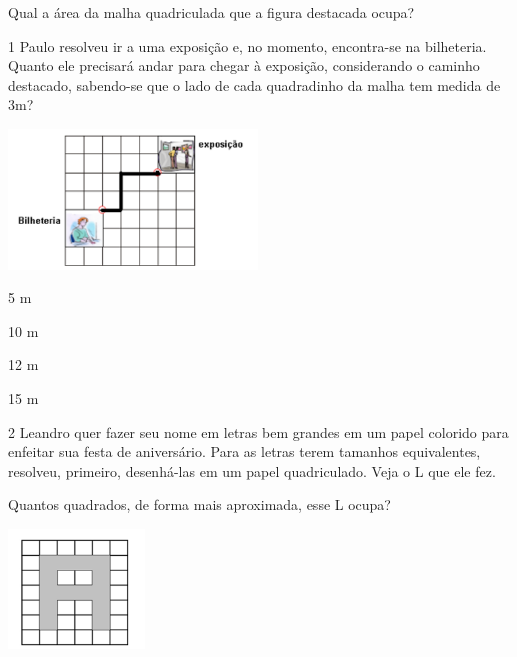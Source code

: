 Qual a área da malha quadriculada que a figura destacada ocupa?




\num{1} Paulo resolveu ir a uma exposição e, no momento, encontra-se na
bilheteria. Quanto ele precisará andar para chegar à exposição,
considerando o caminho destacado, sabendo-se que o lado de cada
quadradinho da malha tem medida de 3m?


\includegraphics[width=2.60897in,height=1.46587in]{./media/image61.png}

\begin{escolha}
\item
  5 m
\item
  10 m
\item
  12 m
\item
  15 m
\end{escolha}

\num{2} Leandro quer fazer seu nome em letras bem grandes em um papel colorido para enfeitar sua festa de aniversário. Para as letras terem tamanhos equivalentes, resolveu, primeiro, desenhá-las em um papel quadriculado. Veja o L que ele fez.


Quantos quadrados, de forma mais aproximada, esse L ocupa?

\includegraphics[width=1.42949in,height=1.25160in]{./media/image62.png}

